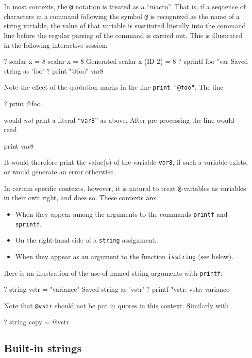 In most contexts, the \verb|@| notation is treated as a ``macro''.
That is, if a sequence of characters in a  command
following the symbol \verb|@| is recognized as the name of a string
variable, the value of that variable is sustituted literally into the
command line before the regular parsing of the command is
carried out.  This is illustrated in the following interactive
session:
%
\begin{code}
? scalar x = 8
 scalar x = 8
Generated scalar x (ID 2) = 8
? sprintf foo "var%
Saved string as 'foo'
? print "@foo"
var8
\end{code}
%
Note the effect of the quotation marks in the line 
\verb|print "@foo"|.  The line
%
\begin{code}
? print @foo
\end{code}
%
would \textit{not} print a literal ``\texttt{var8}'' as above.  After
pre-processing the line would read
%
\begin{code}
print var8
\end{code}
%
It would therefore print the value(s) of the variable \texttt{var8},
if such a variable exists, or would generate an error otherwise.

In certain specific contexts, however, it is natural to treat
\verb|@|-variables as variables in their own right, and 
does so.  These contexts are:
\begin{itemize}
\item When they appear among the arguments to the commands \texttt{printf} and
  \texttt{sprintf}.
\item On the right-hand side of a \texttt{string} assignment.
\item When they appear as an argument to the function
  \texttt{isstring} (see below).
\end{itemize}

Here is an illustration of the use of named string arguments with
\texttt{printf}:
%
\begin{code}
? string vstr = "variance"
Saved string as 'vstr'
? printf "vstr: %
vstr:     variance
\end{code}
%
Note that \verb|@vstr| should not be put in quotes in this context.
Similarly with
\begin{code}
? string copy = @vstr
\end{code}

\subsection{Built-in strings}


